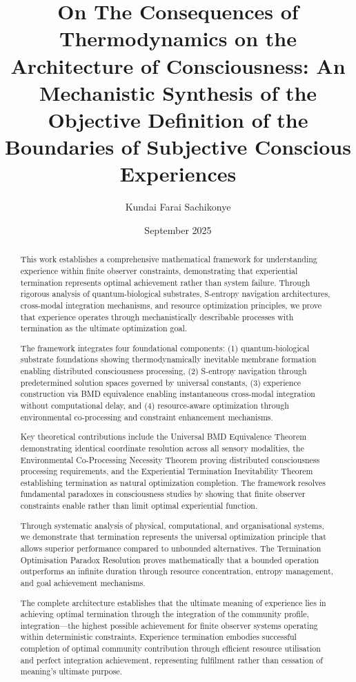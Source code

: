 \documentclass{article}
\title{On The Consequences of Thermodynamics on the Architecture of Consciousness: An Mechanistic Synthesis of the Objective Definition of the Boundaries of Subjective Conscious Experiences }
\author{Kundai Farai Sachikonye}
\date{September 2025}
\begin{document}
\maketitle

\begin{abstract}
This work establishes a comprehensive mathematical framework for understanding experience within finite observer constraints, demonstrating that experiential termination represents optimal achievement rather than system failure. Through rigorous analysis of quantum-biological substrates, S-entropy navigation architectures, cross-modal integration mechanisms, and resource optimization principles, we prove that experience operates through mechanistically describable processes with termination as the ultimate optimization goal.

The framework integrates four foundational components: (1) quantum-biological substrate foundations showing thermodynamically inevitable membrane formation enabling distributed consciousness processing, (2) S-entropy navigation through predetermined solution spaces governed by universal constants, (3) experience construction via BMD equivalence enabling instantaneous cross-modal integration without computational delay, and (4) resource-aware optimization through environmental co-processing and constraint enhancement mechanisms.

Key theoretical contributions include the Universal BMD Equivalence Theorem demonstrating identical coordinate resolution across all sensory modalities, the Environmental Co-Processing Necessity Theorem proving distributed consciousness processing requirements, and the Experiential Termination Inevitability Theorem establishing termination as natural optimization completion. The framework resolves fundamental paradoxes in consciousness studies by showing that finite observer constraints enable rather than limit optimal experiential function.

Through systematic analysis of physical, computational, and organisational systems, we demonstrate that termination represents the universal optimization principle that allows superior performance compared to unbounded alternatives. The Termination Optimisation Paradox Resolution proves mathematically that a bounded operation outperforms an infinite duration through resource concentration, entropy management, and goal achievement mechanisms.

The complete architecture establishes that the ultimate meaning of experience lies in achieving optimal termination through the integration of the community profile, integration—the highest possible achievement for finite observer systems operating within deterministic constraints. Experience termination embodies successful completion of optimal community contribution through efficient resource utilisation and perfect integration achievement, representing fulfilment rather than cessation of meaning's ultimate purpose.


\end{abstract}
\end{document}
